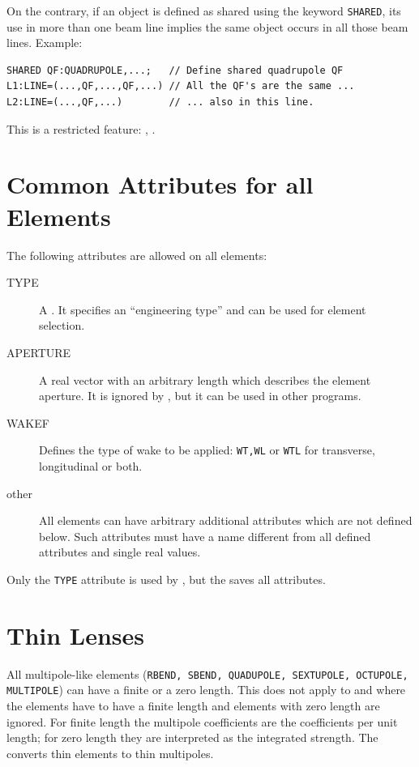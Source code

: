 On the contrary, if an object is defined as shared using the keyword
\texttt{SHARED}, 
its use in more than one beam line implies the same object occurs
in all those beam lines.
Example:
\begin{verbatim}
SHARED QF:QUADRUPOLE,...;   // Define shared quadrupole QF
L1:LINE=(...,QF,...,QF,...) // All the QF's are the same ...
L2:LINE=(...,QF,...)        // ... also in this line.
\end{verbatim}
This is a restricted feature: \noopalt, \noopalcycl.

\section{Common Attributes for all Elements}
\label{sec:common}
The following attributes are allowed on all elements:
\begin{description}
\item[TYPE]
  A .
  It specifies an ``engineering type'' and can be used for element
  selection.
\item[APERTURE]
  A real vector with an arbitrary length which describes
  the element aperture.
  It is ignored by \opal, but it can be used in other programs.
\item[WAKEF]
Defines the type of wake to be applied: \texttt{WT,WL} or \texttt{WTL} for 
transverse, longitudinal or both.
\item[other]
  All elements can have arbitrary additional attributes
  which are not defined below.
  Such attributes must have a name different from all defined attributes
  and single real values.
\end{description}
Only the \texttt{TYPE} attribute is used by \opal,
but the  saves all attributes.

\section{Thin Lenses}
\label{sec:thin}
All multipole-like elements
(\texttt{RBEND, SBEND, QUADUPOLE, SEXTUPOLE, OCTUPOLE, MULTIPOLE})
can have a finite or a zero length. This does not apply to \opalt and \opalcycl where the elements have to have a finite length and elements with zero length are ignored.
For finite length the multipole coefficients are the coefficients per
unit length;
for zero length they are interpreted as the integrated strength.
The  converts thin elements to
thin multipoles.

